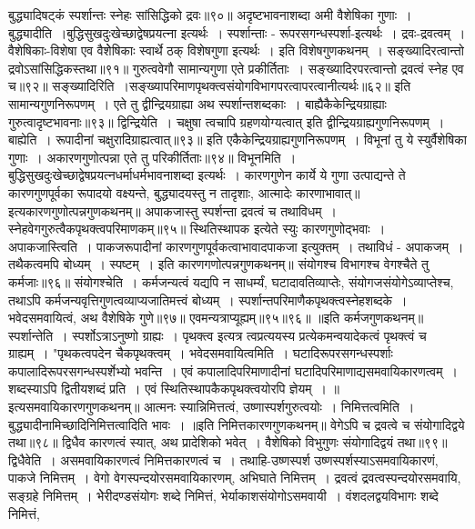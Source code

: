 बुद्ध्यादिषट्कं स्पर्शान्तः स्नेहः सांसिद्धिको द्रवः॥९०॥
अदृष्टभावनाशब्दा अमी वैशेषिका गुणाः~।
बुद्ध्यादीति~।बुद्धिसुखदुःखेच्छाद्वेषप्रयत्ना इत्यर्थः~। स्पर्शान्ताः - रूपरसगन्धस्पर्शा-इत्यर्थः~। द्रवः-द्रवत्वम्~। वैशेषिकाः-विशेषा एव वैशेेषिकाः स्वार्थे ठक् विशेषगुणा
इत्यर्थः~। इति विशेषगुणकथनम्~।
सङ्ख्यादिरत्वान्तो द्रवोऽसांसिद्धिकस्तथा॥९१॥
गुरुत्ववेगौ सामान्यगुणा एते प्रकीर्तिताः~।
सङ्ख्यादिरपरत्वान्तो द्रवत्वं स्नेह एव च॥९२॥
सङ्ख्यादिरिति~।सङ्ख्यापरिमाणपृथक्त्वसंयोगविभागपरत्वापरत्वानीत्यर्थः॥६२॥
इति सामान्यगुणनिरूपणम्~।
एते तु द्वीन्द्रियग्राह्या अथ स्पर्शान्तशब्दकाः~।
बाह्यैकैकेन्द्रियग्राह्याः गुरुत्वादृष्टभावनाः॥९३॥
द्विन्द्रियेति~। चक्षुषा त्वचापि ग्रहणयोग्यत्वात्
इति द्वीन्द्रियग्राह्यगुणनिरूपणम्~।
बाह्येति~। रूपादीनां चक्षुरादिग्राह्यत्वात्॥९३॥
इति एकैकेन्द्रियग्राह्यगुणनिरूपणम्~।
विभूनां तु ये स्युर्वैशेषिका गुणाः~।
अकारणगुणोत्पन्ना एते तु परिकीर्तिताः॥९४॥
विभूनमिति~। बुद्धिसुखदुःखेच्छाद्वेषप्रयत्नधर्माधर्मभावनाशब्दा इत्यर्थः~। कारणगुणेन कार्ये ये गुणा उत्पाद्यन्ते ते कारणगुणपूर्वका रूपादयो वक्ष्यन्ते, बुद्ध्यादयस्तु न
तादृशाः, आत्मादेः कारणाभावात्॥इत्यकारणगुणोत्पन्नगुणकथनम्॥
अपाकजास्तु स्पर्शन्ता द्रवत्वं च तथाविधम्~।
स्नेहवेगगुरुत्वैकपृथक्त्वपरिमाणकम्॥९५॥
स्थितिस्थापक इत्येते स्युः कारणगुणोद्भवाः~।
अपाकजास्त्विति~। पाकजरूपादीनां कारणगुणपूर्वकत्वाभावादपाकजा इत्युक्तम्~। तथाविधं - अपाकजम्~। तथैकत्वमपि बोध्यम्~। स्पष्टम्~।
इति कारणगणोत्पन्नगुणकथनम्॥
संयोगश्च विभागश्च वेगश्चैते तु कर्मजाः॥९६॥
संयोगश्चेति~। कर्मजन्यत्वं यद्यपि न साधर्म्यं, घटादावतिव्याप्तेः, संयोगजसंयोगेऽव्याप्तेश्च, तथाऽपि कर्मजन्यवृत्तिगुणत्वव्याप्यजातिमत्त्वं बोध्यम्~।
स्पर्शान्तपरिमाणैकपृथक्त्वस्नेहशब्दके~।
भवेदसमवायित्वं, अथ वैशेषिके गुणे॥९७॥
एवमन्यत्राप्यूह्यम्॥९५॥९६॥
॥इति कर्मजगुणकथनम्॥
स्पर्शान्तेति~। स्पर्शोऽत्राऽनुष्णो ग्राह्यः~। पृथक्त्व इत्यत्र त्वप्रत्ययस्य प्रत्येकमन्वयादेकत्वं पृथक्त्वं च ग्राह्यम्~। "पृथकत्वपदेन चैकपृथक्त्वम्~।
भवेदसमवायित्वमिति~। घटादिरूपरसगन्धस्पर्शाः कपालादिरूपरसगन्धस्पर्शेभ्यो भवन्ति~। एवं कपालादिपरिमाणादीनां घटादिपरिमाणाद्यसमवायिकारणत्वम्~। शब्दस्याऽपि
द्वितीयशब्दं प्रति~। एवं स्थितिस्थापकैकपृथक्त्वयोरपि ज्ञेयम्~।
॥इत्यसमवायिकारणगुणकथनम्॥
आत्मनः स्यान्निमित्तत्वं, उष्णास्पर्शगुरुत्वयोः~।
निमित्तत्वमिति~। बुद्ध्यादीनामिच्छादिनिमित्तत्वादिति भावः~।
॥इति निमित्तकारणगुणकथनम्॥
वेगेऽपि च द्रवत्वे च संयोगादिद्वये तथा॥९८॥
द्विधैव कारणत्वं स्यात्, अथ प्रादेशिको भवेत्~।
वैशेषिको विभुगुणः संयोगादिद्वयं तथा॥९९॥
द्विधैवेति~। असमवायिकारणत्वं निमित्तकारणत्वं च~। तथाहि-उष्णस्पर्श उष्णस्पर्शस्याऽसमवायिकारणं, पाकजे निमित्तम्~। वेगो वेगस्पन्दयोरसमवायिकारणम्,
अभिघाते निमित्तम्~। द्रवत्वं द्रवत्वस्पन्दयोरसमवायि, सङ्ग्रहे निमित्तम्~। भेेरीदण्डसंयोगः शब्दे निमित्तं, भेर्याकाशसंयोगोऽसमवायी~। वंशदलद्वयविभागः शब्दे निमित्तं,

